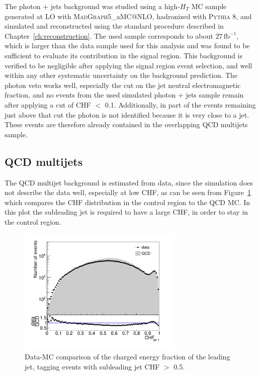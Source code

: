 The photon + jets background was studied using a high-$H_T$ MC sample generated at \ac{LO} with \textsc{MadGraph5\_}a\textsc{MC@NLO}, hadronized with \textsc{Pythia 8}, and simulated and reconstructed using the standard procedure described in Chapter~\ref{ch:reconstruction}. The used sample corresponds to about $27\, \mathrm{fb}^{-1}$, which is larger than the data sample used for this analysis and was found to be sufficient to evaluate its contribution in the signal region. This background is verified to be negligible after applying the signal region event selection, and well within any other systematic uncertainty on the background prediction. The photon veto works well, especially the cut on the jet neutral electromagnetic fraction, and no events from the used simulated photon + jets sample remain after applying a cut of CHF $<$ 0.1. Additionally, in part of the events remaining just above that cut the photon is not identified because it is very close to a jet. These events are therefore already contained in the overlapping \ac{QCD} multijets sample.

\subsection{QCD multijets}

The \ac{QCD} multijet background is estimated from data, since the simulation does not describe the data well, especially at low CHF, as can be seen from Figure~\ref{fig:dataMC} which compares the CHF distribution in the control region to the \ac{QCD} MC. In this plot the subleading jet is required to have a large CHF, in order to stay in the control region.

\begin{figure}[ht]
  \centering
  \includegraphics[width=0.7\textwidth]{figures/bkgd_estimation_dataMC.pdf}\hfill%
  \caption{Data-MC comparison of the charged energy fraction of the leading jet, tagging events with subleading jet CHF $>$ 0.5.}
  \label{fig:dataMC}
\end{figure}

